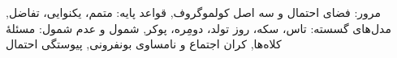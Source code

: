 \documentclass[a4paper,11pt,oneside,openany]{book}
\begin{document}
  {{مرور: فضای احتمال و سه اصل کولموگروف},
   {قواعد پایه: متمم، یکنوایی، تفاضل},
   {مدل‌های گسسته: تاس، سکه، روز تولد، دومِره، پوکر},
   {شمول و عدم شمول: مسئلهٔ کلاه‌ها},
   {کران اجتماع و نامساوی بونفرونی},
   {پیوستگی احتمال}}

\mainmatter
\setcounter{chapter}{2}   %

\end{document}
